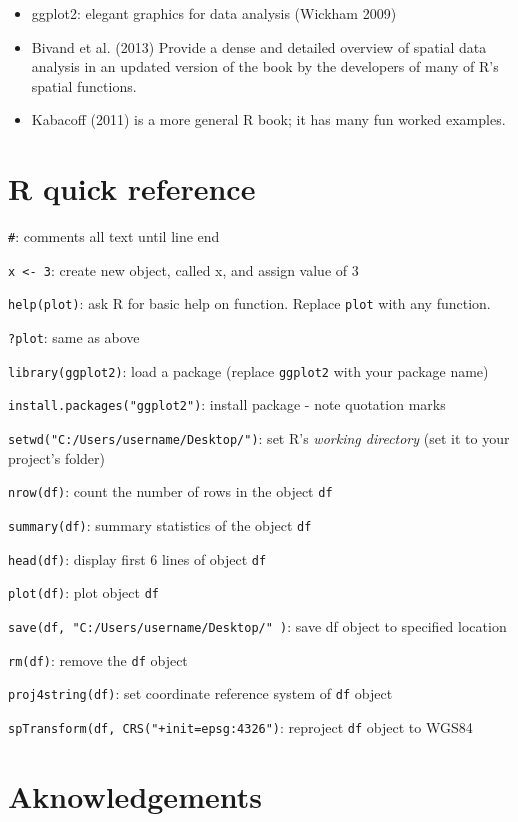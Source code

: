 \documentclass[]{article}
\begin{document}
\begin{itemize}
\item
  ggplot2: elegant graphics for data analysis (Wickham 2009)
\item
  Bivand et al. (2013) Provide a dense and detailed overview of spatial
  data analysis in an updated version of the book by the developers of
  many of R's spatial functions.
\item
  Kabacoff (2011) is a more general R book; it has many fun worked
  examples.
\end{itemize}
\section{R quick reference}

\texttt{\#}: comments all text until line end

\texttt{x \textless{}- 3}: create new object, called x, and assign value
of 3

\texttt{help(plot)}: ask R for basic help on function. Replace
\texttt{plot} with any function.

\texttt{?plot}: same as above

\texttt{library(ggplot2)}: load a package (replace \texttt{ggplot2} with
your package name)

\texttt{install.packages("ggplot2")}: install package - note quotation
marks

\texttt{setwd("C:/Users/username/Desktop/")}: set R's \emph{working
directory} (set it to your project's folder)

\texttt{nrow(df)}: count the number of rows in the object \texttt{df}

\texttt{summary(df)}: summary statistics of the object \texttt{df}

\texttt{head(df)}: display first 6 lines of object \texttt{df}

\texttt{plot(df)}: plot object \texttt{df}

\texttt{save(df, "C:/Users/username/Desktop/" )}: save df object to
specified location

\texttt{rm(df)}: remove the \texttt{df} object

\texttt{proj4string(df)}: set coordinate reference system of \texttt{df}
object

\texttt{spTransform(df, CRS("+init=epsg:4326")}: reproject \texttt{df}
object to WGS84

\section{Aknowledgements}
\end{document}

